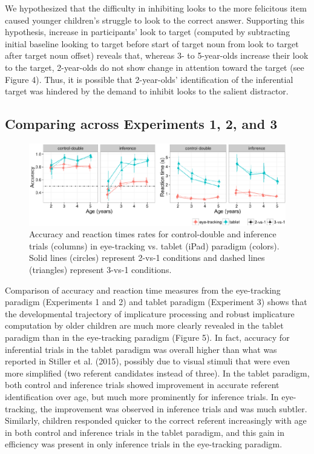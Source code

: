 \documentclass[a4paper,man,apacite,floatsintext]{apa6}
\newenvironment{CodeChunk}{}{}
\begin{document}
We hypothesized that the difficulty in inhibiting looks to the more
felicitous item caused younger children's struggle to look to the
correct answer. Supporting this hypothesis, increase in participants'
look to target (computed by subtracting initial baseline looking to
target before start of target noun from look to target after target noun
offset) reveals that, whereas 3- to 5-year-olds increase their look to
the target, 2-year-olds do not show change in attention toward the
target (see Figure 4). Thus, it is possible that 2-year-olds'
identification of the inferential target was hindered by the demand to
inhibit looks to the salient distractor.

\subsection{Comparing across Experiments 1, 2, and
3}\label{comparing-across-experiments-1-2-and-3}

\begin{CodeChunk}
\begin{figure}[H]

{\centering \includegraphics{figs/etip_comp-1} 

}

\caption[Accuracy and reaction times rates for control-double and inference trials (columns) in eye-tracking vs]{Accuracy and reaction times rates for control-double and inference trials (columns) in eye-tracking vs. tablet (iPad) paradigm (colors). Solid lines (circles) represent 2-vs-1 conditions and dashed lines (triangles) represent 3-vs-1 conditions.}\label{fig:etip_comp}
\end{figure}
\end{CodeChunk}

Comparison of accuracy and reaction time measures from the eye-tracking
paradigm (Experiments 1 and 2) and tablet paradigm (Experiment 3) shows
that the developmental trajectory of implicature processing and robust
implicature computation by older children are much more clearly revealed
in the tablet paradigm than in the eye-tracking paradigm (Figure 5). In
fact, accuracy for inferential trials in the tablet paradigm was overall
higher than what was reported in Stiller et al. (2015), possibly due to
visual stimuli that were even more simplified (two referent candidates
instead of three). In the tablet paradigm, both control and inference
trials showed improvement in accurate referent identification over age,
but much more prominently for inference trials. In eye-tracking, the
improvement was observed in inference trials and was much subtler.
Similarly, children responded quicker to the correct referent
increasingly with age in both control and inference trials in the tablet
paradigm, and this gain in efficiency was present in only inference
trials in the eye-tracking paradigm.
\end{document}
